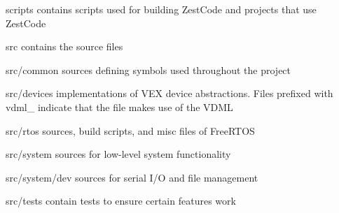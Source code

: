 \begin{DoxyItemize}
\item {\ttfamily scripts} contains scripts used for building Zest\+Code and projects that use Zest\+Code
\item {\ttfamily src} contains the source files
\begin{DoxyItemize}
\item {\ttfamily src/common} sources defining symbols used throughout the project
\item {\ttfamily src/devices} implementations of VEX device abstractions. Files prefixed with {\ttfamily vdml\+\_\+} indicate that the file makes use of the VDML
\item {\ttfamily src/rtos} sources, build scripts, and misc files of Free\+RTOS
\item {\ttfamily src/system} sources for low-\/level system functionality
\begin{DoxyItemize}
\item {\ttfamily src/system/dev} sources for serial I/O and file management
\end{DoxyItemize}
\item {\ttfamily src/tests} contain tests to ensure certain features work 
\end{DoxyItemize}
\end{DoxyItemize}